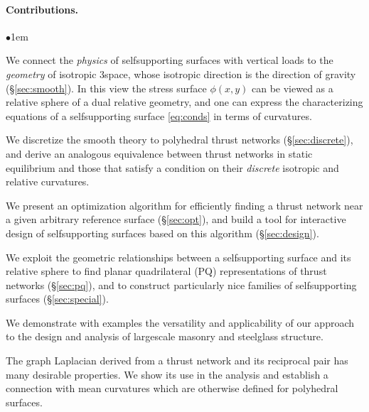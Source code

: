\documentclass[annual]{acmsiggraph}
\newcommand{\secref}[1]{(\S\ref{#1})}
\begin{document}
\paragraph{Contributions.}


\begin{list}{$\bullet$}{\itemindent1em}

\item We connect the \emph{physics} of self\dash supporting surfaces with 
vertical loads to the \emph{geometry} of isotropic 3\dash space, whose isotropic 
direction is the direction of gravity \secref{sec:smooth}. In this view 
the stress surface $\phi(x,y)$ can be viewed as a relative sphere of a 
dual relative geometry, and one can express the characterizing equations 
of a self\dash supporting surface \eqref{eq:conds} in terms of curvatures.

\item We discretize the smooth theory to polyhedral thrust networks 
\secref{sec:discrete}, and derive an analogous equivalence between thrust 
networks in static equilibrium and those that satisfy a condition on their 
\emph{discrete} isotropic and relative curvatures.

\item We present an optimization algorithm for efficiently finding a thrust network 
near a given arbitrary reference surface \secref{sec:opt}, and build a 
tool for interactive design of self\dash supporting surfaces based on this 
algorithm \secref{sec:design}.

\item We exploit the geometric relationships between a self\dash supporting surface 
and its relative sphere to find planar quadrilateral (PQ) representations 
of thrust networks \secref{sec:pq}, and to construct particularly nice 
families of self\dash supporting surfaces \secref{sec:special}.

\item We demonstrate with examples the versatility and applicability of 
our approach to the design and analysis of large\dash scale masonry and 
steel\dash glass structure.

\item The graph Laplacian derived from a thrust network and its reciprocal
pair has many desirable properties. We show its use in the analysis and
establish a connection with mean curvatures which are otherwise defined
for polyhedral surfaces.

\end{list}
\end{document}

